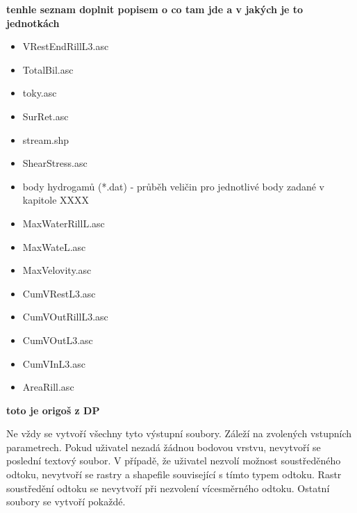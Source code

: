 
\textbf{tenhle seznam doplnit popisem o co tam jde a v jakých je to jednotkách}
\begin{itemize}
\item VRestEndRillL3.asc
\item TotalBil.asc
\item toky.asc
\item SurRet.asc
\item stream.shp
\item ShearStress.asc
\item body hydrogamů (*.dat) - průběh veličin pro jednotlivé body zadané v kapitole XXXX
\item MaxWaterRillL.asc
\item MaxWateL.asc
\item MaxVelovity.asc
\item CumVRestL3.asc
\item CumVOutRillL3.asc
\item CumVOutL3.asc
\item CumVInL3.asc
\item AreaRill.asc
\end{itemize}

\textbf{toto je origoš z DP}

\par Ne vždy se vytvoří všechny tyto výstupní soubory. Záleží na zvolených vstupních parametrech. Pokud uživatel nezadá žádnou bodovou vrstvu, nevytvoří se poslední textový soubor. 
V případě, že uživatel nezvolí možnost soustředěného odtoku, nevytvoří se rastry a shapefile související s tímto typem odtoku. Rastr soustředění odtoku se nevytvoří při nezvolení vícesměrného odtoku. 
Ostatní soubory se vytvoří pokaždé.  

